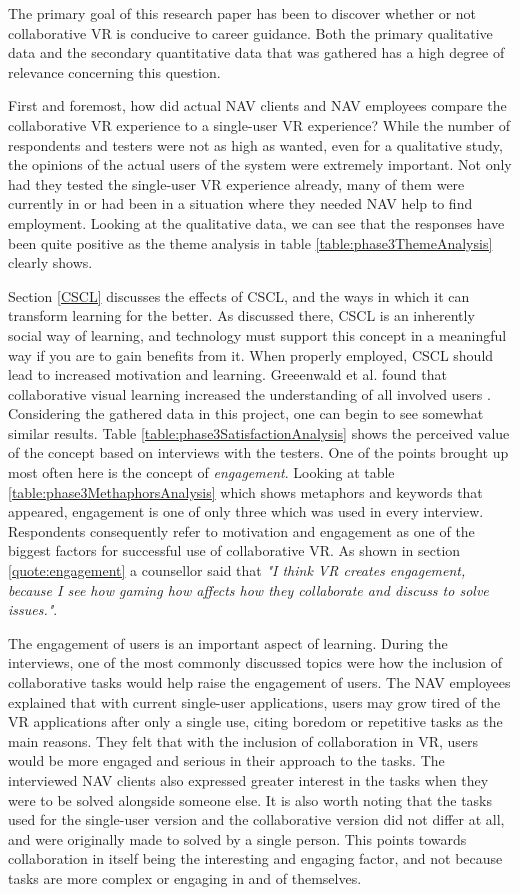 The primary goal of this research paper has been to discover whether or not collaborative VR is conducive to career guidance. Both the primary qualitative data and the secondary quantitative data that was gathered has a high degree of relevance concerning this question. 

First and foremost, how did actual NAV clients and NAV employees compare the collaborative VR experience to a single-user VR experience? While the number of respondents and testers were not as high as wanted, even for a qualitative study, the opinions of the actual users of the system were extremely important. Not only had they tested the single-user VR experience already, many of them were currently in or had been in  a situation where they needed NAV help to find employment. Looking at the qualitative data, we can see that the responses have been quite positive as the theme analysis in table \ref{table:phase3ThemeAnalysis} clearly shows. 

Section \ref{CSCL} discusses the effects of CSCL, and the ways in which it can transform learning for the better. As discussed there, CSCL is an inherently social way of learning, and technology must support this concept in a meaningful way if you are to gain benefits from it. When properly employed, CSCL should lead to increased motivation and learning. Greeenwald et al. found that collaborative visual learning increased the understanding of all involved users \cite{greenwald2017technology}. Considering the gathered data in this project, one can begin to see somewhat similar results. Table \ref{table:phase3SatisfactionAnalysis} shows the perceived value of the concept based on interviews with the testers. One of the points brought up most often here is the concept of \textit{engagement}. Looking at table \ref{table:phase3MethaphorsAnalysis} which shows metaphors and keywords that appeared, engagement is one of only three which was used in every interview. Respondents consequently refer to motivation and engagement as one of the biggest factors for successful use of collaborative VR. As shown in section \ref{quote:engagement} a counsellor said that \textit{"I think VR creates engagement, because I see how gaming how affects how they collaborate and discuss to solve issues."}. 


The engagement of users is an important aspect of learning. During the interviews, one of the most commonly discussed topics were how the inclusion of collaborative tasks would help raise the engagement of users. The NAV employees explained that with current single-user applications, users may grow tired of the VR applications after only a single use, citing boredom or repetitive tasks as the main reasons. They felt that with the inclusion of collaboration in VR, users would be more engaged and serious in their approach to the tasks. The interviewed NAV clients also expressed greater interest in the tasks when they were to be solved alongside someone else. It is also worth noting that the tasks used for the single-user version and the collaborative version did not differ at all, and were originally made to solved by a single person. This points towards collaboration in itself being the interesting and engaging factor, and not because tasks are more complex or engaging in and of themselves. 

